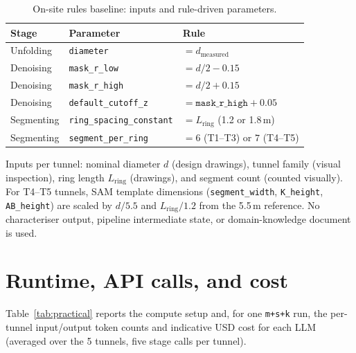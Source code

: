 \begin{table}[ht]
\caption{On-site rules baseline: inputs and rule-driven parameters.}\label{tab:rules-spec}
\begin{tabular*}{\tblwidth}{@{} l l l @{}}
\toprule
Stage & Parameter & Rule \\
\midrule
Unfolding & \texttt{diameter} & $= d_{\mathrm{measured}}$ \\
Denoising & \texttt{mask\_r\_low} & $= d/2 - 0.15$ \\
Denoising & \texttt{mask\_r\_high} & $= d/2 + 0.15$ \\
Denoising & \texttt{default\_cutoff\_z} & $= \texttt{mask\_r\_high} + 0.05$ \\
Segmenting & \texttt{ring\_spacing\_constant} & $= L_{\mathrm{ring}}$ (1.2 or 1.8\,m) \\
Segmenting & \texttt{segment\_per\_ring} & $= 6$ (T1--T3) or $7$ (T4--T5) \\
\bottomrule
\end{tabular*}
\end{table}

\noindent Inputs per tunnel: nominal diameter $d$ (design drawings), tunnel family (visual inspection), ring length $L_{\mathrm{ring}}$ (drawings), and segment count (counted visually). For T4--T5 tunnels, SAM template dimensions (\texttt{segment\_width}, \texttt{K\_height}, \texttt{AB\_height}) are scaled by $d/5.5$ and $L_\mathrm{ring}/1.2$ from the 5.5\,m reference. No characteriser output, pipeline intermediate state, or domain-knowledge document is used.

\section{Runtime, API calls, and cost}\label{app:practical}
Table~\ref{tab:practical} reports the compute setup and, for one \texttt{m+s+k} run, the per-tunnel input/output token counts and indicative USD cost for each LLM (averaged over the 5 tunnels, five stage calls per tunnel).

